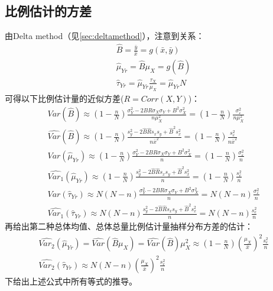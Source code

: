 \subsection{比例估计的方差}
由Delta method（见\cref{sec:deltamethod}），注意到关系：
\begin{gather*}
	\hat{B}=\frac{\bar{y}}{\bar{x}}=g(\bar{x},\bar{y}) \\
	\hat{\mu}_{Yr}=\hat{B}\mu_X=g(\hat{B}) \\
	\hat{\tau}_{Yr}=\hat{\mu}_{Yr}\frac{\tau_X}{\mu_X}=\hat{\mu}_{Yr}N
\end{gather*}
可得以下比例估计量的近似方差($R=Corr(X,Y)$)：
\begin{gather*}
	Var(\hat{B})\approx\left(1-\frac{n}{N}\right)\frac{\sigma_Y^2-2BR\sigma_X\sigma_Y+B^2\sigma_X^2}{n\mu_X^2}=\left(1-\frac{n}{N}\right)\frac{\sigma_\varepsilon^2}{n\mu_X^2} \\
	\widehat{Var}(\hat{B})\approx\left(1-\frac{n}{N}\right)\frac{s_y^2-2\hat{B}\hat{R}s_xs_y+\hat{B}^2s_x^2}{n\bar{x}^2}=\left(1-\frac{n}{N}\right)\frac{s_e^2}{n\bar{x}^2} \\
	Var(\hat{\mu}_{Yr})\approx\left(1-\frac{n}{N}\right)\frac{\sigma_Y^2-2BR\sigma_X\sigma_Y+B^2\sigma_X^2}{n}=\left(1-\frac{n}{N}\right)\frac{\sigma_\varepsilon^2}{n}  \\
	\widehat{Var_1}(\hat{\mu}_{Yr})\approx\left(1-\frac{n}{N}\right)\frac{s_y^2-2\hat{B}\hat{R}s_xs_y+\hat{B}^2s_x^2}{n}=\left(1-\frac{n}{N}\right)\frac{s_e^2}{n}  \\
	Var(\hat{\tau}_{Yr})\approx N\left(N-n\right)\frac{\sigma_Y^2-2BR\sigma_X\sigma_Y+B^2\sigma_X^2}{n}=N(N-n)\frac{\sigma_\varepsilon^2}{n} \\
	\widehat{Var_1}(\hat{\tau}_{Yr})\approx N(N-n)\frac{s_y^2-2\hat{B}\hat{R}s_xs_y+\hat{B}^2s_x^2}{n}=N(N-n)\frac{s_e^2}{n}
\end{gather*}
再给出第二种总体均值、总体总量比例估计量抽样分布方差的估计：
\begin{gather*}
	\widehat{Var_2}(\hat{\mu}_{Yr})=\widehat{Var}(\hat{B}\mu_X)=\widehat{Var}(\hat{B})\mu_X^2\approx\left(1-\frac{n}{N}\right)\left(\frac{\mu_X}{\bar{x}}\right)^2\frac{s_e^2}{n} \\
	\widehat{Var_2}(\hat{\tau}_{Yr})\approx N(N-n)\left(\frac{\mu_X}{\bar{x}}\right)^2\frac{s_e^2}{n} 
\end{gather*}
下给出上述公式中所有等式的推导。
